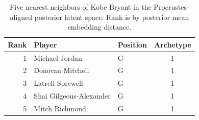 \begin{table}[htbp]
  \centering\small
  \begin{tabular}{rllc}
    \toprule
    Rank & Player & Position & Archetype \\
    \midrule
    1 & Michael Jordan & G & 1 \\
    2 & Donovan Mitchell & G & 1 \\
    3 & Latrell Sprewell & G & 1 \\
    4 & Shai Gilgeous-Alexander & G & 1 \\
    5 & Mitch Richmond & G & 1 \\
    \bottomrule
  \end{tabular}
  \caption{Five nearest neighbors of Kobe Bryant in the Procrustes-aligned posterior latent space. Rank is by posterior mean embedding distance.}
  \label{tab:Kobe_Bryant_neighbors}
\end{table}

